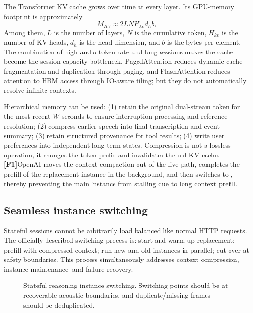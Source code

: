 \documentclass[UTF8,fontset=none,a4paper,10pt]{ctexart}
\newcommand{\FOne}{\textcolor{official}{\textbf{[F1]}}}
\begin{document}
The Transformer KV cache grows over time at every layer. Its GPU-memory footprint is approximately
\begin{equation}
M_{KV}\approx 2LNH_{kv}d_hb,
\end{equation}
Among them, $L$ is the number of layers, $N$ is the cumulative token, $H_{kv}$ is the number of KV heads, $d_h$ is the head dimension, and $b$ is the bytes per element. The combination of high audio token rate and long sessions makes the cache become the session capacity bottleneck. PagedAttention reduces dynamic cache fragmentation and duplication through paging, and FlashAttention reduces attention to HBM access \cite{en:kwon2023pagedattention,en:dao2022flashattention} through IO-aware tiling; but they do not automatically resolve infinite contexts.

Hierarchical memory can be used: (1) retain the original dual-stream token for the most recent $W$ seconds to ensure interruption processing and reference resolution; (2) compress earlier speech into final transcription and event summary; (3) retain structured provenance for tool results; (4) write user preferences into independent long-term states. Compression is not a lossless operation, it changes the token prefix and invalidates the old KV cache. \FOne OpenAI moves the context compaction out of the live path, completes the prefill of the replacement instance in the background, and then switches to \cite{en:openai2026continuous}, thereby preventing the main instance from stalling due to long context prefill.

\subsection{Seamless instance switching}

Stateful sessions cannot be arbitrarily load balanced like normal HTTP requests. The officially described switching process is: start and warm up replacement; prefill with compressed context; run new and old instances in parallel; cut over at safety boundaries. This process simultaneously addresses context compression, instance maintenance, and failure recovery.

\begin{figure}[H]
\centering
{}
\caption{Stateful reasoning instance switching. Switching points should be at recoverable acoustic boundaries, and duplicate/missing frames should be deduplicated.}
\end{figure}
\end{document}
